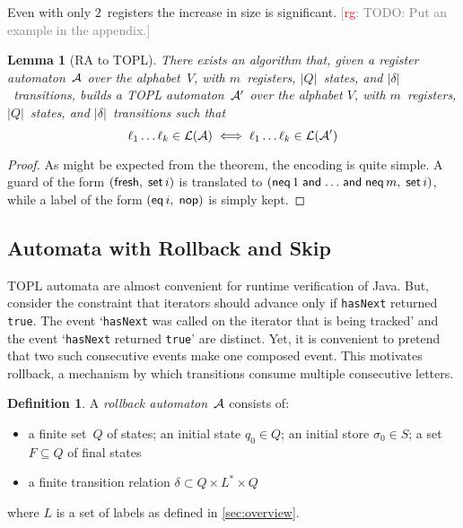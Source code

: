 \documentclass[9pt, preprint]{sigplanconf} %
\newcommand{\noterg}[2]{\textcolor{gray}{[\textcolor{red}{#1}: #2]}}
\newcommand{\rg}[1]{\noterg{rg}{#1}}
\newtheorem{lemma}{Lemma}
\theoremstyle{definition}
\newtheorem{definition}{Definition}
\theoremstyle{remark}
\begin{document}
Even with only $2$~registers the increase in size is significant.
\rg{TODO: Put an example in the appendix.}

\begin{lemma}[RA to TOPL]\label{lemma:ra-to-topl}
There exists an algorithm that, given a register automaton~${\cal A}$ over the alphabet~$V$, with $m$~registers, $|Q|$~states, and $|\delta|$~transitions, builds a TOPL automaton~${\cal A}'$ over the alphabet $V$, with $m$~registers, $|Q|$~states, and $|\delta|$~transitions such that
\[\ell_1\ldots \ell_k\in{\cal L}({\cal A}) \iff
  \ell_1\ldots \ell_k\in{\cal L}({\cal A}') \]
\end{lemma}
\begin{proof}
  As might be expected from the theorem, the encoding is quite
  simple. A guard of the form $({\sf fresh},\;{\sf set}\,i)$ is
  translated to $({\sf neq}\,1  \mathrel{\sf and} \ldots  \mathrel{\sf and} {\sf neq}\,m,\;{\sf set}\,i)$, while a label of the
  form $({\sf eq}\,i,\; {\sf nop})$ is simply kept.
\end{proof}

\subsection{Automata with Rollback and Skip} %

TOPL automata are almost convenient for runtime verification of Java.
But, consider the constraint that iterators should advance only if {\tt hasNext} returned {\tt true}.
The event `{\tt hasNext} was called on the iterator that is being tracked' and the event `{\tt hasNext} returned {\tt true}' are distinct.
Yet, it is convenient to pretend that two such consecutive events make one composed event.
This motivates rollback, a mechanism by which transitions consume multiple consecutive letters.

\begin{definition}\label{def:rollback}
A \emph{rollback automaton}~${\cal A}$ consists of:
\begin{itemize}
\item a finite set~$Q$ of states; an initial state $q_0\in Q$; an initial store $\sigma_0\in S$; a set $F\subseteq Q$ of final states
\item a finite transition relation $\delta\subset Q\times L^*\times Q$
\end{itemize}
where $L$ is a set of labels as defined in \autoref{sec:overview}.
\end{definition}
\end{document}
